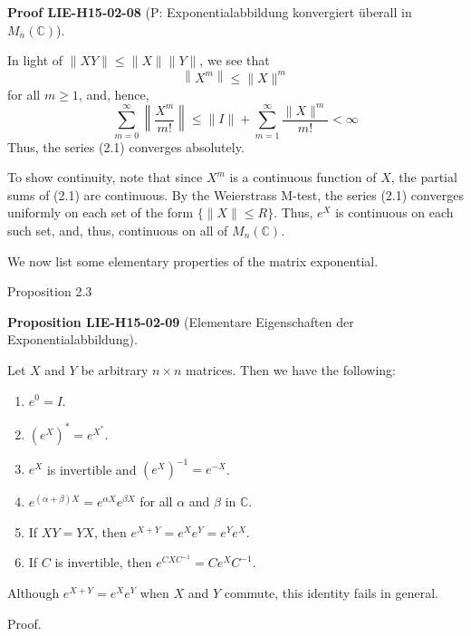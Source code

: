 \documentclass[10pt, letterpaper]{article}
\newcommand{\C}{\mathbb{C}}
\newcommand{\CustomHeading}[3]{%
  \par\medskip\noindent%
  \textbf{#1 #2} \textnormal{(#3)}.\enskip%
}
\newenvironment{PROP}[2]{\begin{unitbox}\CustomHeading{Proposition}{#1}{#2}}{\end{unitbox}}
\newenvironment{PROOF}[2]{\begin{unitbox}\CustomHeading{Proof}{#1}{#2}}{\end{unitbox}}
\begin{document}
\begin{PROOF}{LIE-H15-02-08}{P: Exponentialabbildung konvergiert überall in $M_n(\C)$}
In light of $\|X Y\| \leq\|X\|\|Y\|$, we see that
$$
\left\|X^{m}\right\| \leq\|X\|^{m}
$$
for all $m \geq 1$, and, hence,
$$
\sum_{m=0}^{\infty}\left\|\frac{X^{m}}{m!}\right\| \leq\|I\|+\sum_{m=1}^{\infty} \frac{\|X\|^{m}}{m!}<\infty
$$
Thus, the series (2.1) converges absolutely.

To show continuity, note that since $X^{m}$ is a continuous function of $X$, the partial sums of (2.1) are continuous. By the Weierstrass M-test, the series (2.1) converges uniformly on each set of the form $\{\|X\| \leq R\}$. Thus, $e^{X}$ is continuous on each such set, and, thus, continuous on all of $M_{n}(\mathbb{C})$.
\end{PROOF}



We now list some elementary properties of the matrix exponential.


Proposition 2.3 

\begin{PROP}{LIE-H15-02-09}{Elementare Eigenschaften der Exponentialabbildung}
Let $X$ and $Y$ be arbitrary $n \times n$ matrices. Then we have the following:
\begin{enumerate}
  \item $e^{0}=I$.
  \item $\left(e^{X}\right)^{*}=e^{X^{*}}$.
  \item $e^{X}$ is invertible and $\left(e^{X}\right)^{-1}=e^{-X}$.
  \item $e^{(\alpha+\beta) X}=e^{\alpha X} e^{\beta X}$ for all $\alpha$ and $\beta$ in $\mathbb{C}$.
  \item If $X Y=Y X$, then $e^{X+Y}=e^{X} e^{Y}=e^{Y} e^{X}$.
  \item If $C$ is invertible, then $e^{C X C^{-1}}=C e^{X} C^{-1}$.
\end{enumerate}
Although $e^{X+Y}=e^{X} e^{Y}$ when $X$ and $Y$ commute, this identity fails in general.
\end{PROP}

Proof. 
\end{document}
